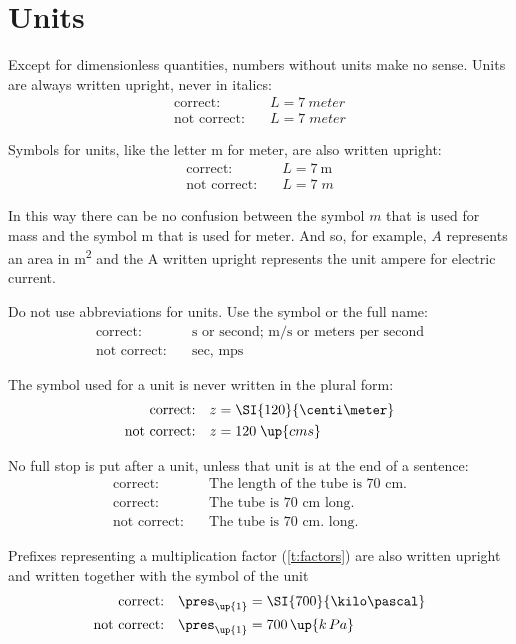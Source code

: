 \section{Units}\label{sec:formatunits}
Except for dimensionless quantities, numbers without units make no sense. Units are always written upright, never in italics:
\begin{align*}
    \text{correct:} \quad & L = \SI{7}{meter} \\
    \text{not correct:} \quad & L = 7 \; meter
\end{align*}

Symbols for units, like the letter m for meter, are also written upright:
\begin{align*}
    \text{correct:} \quad & L = \SI{7}{\meter} \\
    \text{not correct:} \quad & L = 7 \; m
\end{align*}

In this way there can be no confusion between the symbol $m$ that is used for mass and the symbol m that is used for meter. And so, for example, $A$ represents an area in \si{\square\meter} and the A written upright represents the unit ampere for electric current.

Do not use abbreviations for units. Use the symbol or the full name:
\begin{align*}
    \text{correct:} \quad & \text{s or second; m/s or meters per second} \\
    \text{not correct:} \quad & \text{sec, mps}
\end{align*}

The symbol used for a unit is never written in the plural form:
\begin{align*}
    \text{correct:} \quad & z = \SI{120}{\centi\meter}\\
    \text{not correct:} \quad & z = 120 \; \up{cms}
\end{align*}

No full stop is put after a unit, unless that unit is at the end of a sentence:
\begin{align*}
    \text{correct:} \quad & \text{The length of the tube is 70~cm.}\\
    \text{correct:} \quad & \text{The tube is 70~cm long.} \\
    \text{not correct:} \quad & \text{The tube is 70~cm. long.}
\end{align*}

Prefixes representing a multiplication factor (\cref{t:factors}) are also written upright and written together with the symbol of the unit
\begin{align*}
    \text{correct:} \quad & \pres_\up{1} = \SI{700}{\kilo\pascal} \\
    \text{not correct:} \quad & \pres_\up{1} = 700 \, \up{k \, Pa}
\end{align*}


